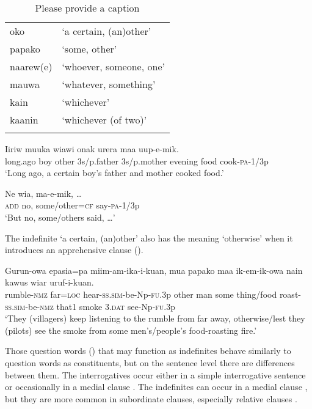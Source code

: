 \begin{table}
\caption{Please provide a caption}
\label{} 
\begin{tabular}{ll}
\mytoprule
oko &`a certain, (an)other'\\
papako &`some, other'\\
naarew(e) &`whoever, someone, one'\\
mauwa &`whatever, something'\\
kain &`whichever'\\
kaanin &`whichever (of two)'\\
\mybottomrule
\end{tabular}
\end{table}


\ea%
\label{ex:3:x641}
\gll Iiriw muuka  wiawi onak urera maa uup-e-mik.\\
long.ago boy other 3s/p.father 3s/p.mother evening food cook-\textsc{pa}-1/3p\\
\glt`Long ago, a certain boy's father and mother cooked food.'
\z

\ea%
\label{ex:3:x642}
\gll Ne wia,  ma-e-mik, {\dots} \\
\textsc{add} no, some/other=\textsc{cf} say-\textsc{pa}-1/3p\\
\glt`But no, some/others said, {\dots}'
\z

The indefinite  `a certain, (an)other' also has the meaning `otherwise' when it introduces an apprehensive clause ().

\ea%
\label{ex:3:x741}
\gll Gurun-owa epasia=pa miim-am-ika-i-kuan,  mua papako maa ik-em-ik-owa nain kawus wiar uruf-i-kuan.\\
rumble-\textsc{nmz} far=\textsc{loc} hear-\textsc{ss}.\textsc{sim}-be-Np-\textsc{fu}.3p other man some thing/food roast-\textsc{ss}.\textsc{sim}-be-\textsc{nmz} that1 smoke 3.\textsc{dat} see-Np-\textsc{fu}.3p\\
\glt`They (villagers) keep listening to the rumble from far away, otherwise/lest they (pilots) see the smoke from some men's/people's food-roasting fire.'
\z

Those question words () that may function as indefinites behave similarly to question words as  constituents, but on the sentence level there are differences between them. The interrogatives occur either in a simple interrogative sentence or occasionally in a medial clause . The indefinites can occur in a medial clause , but they are more common in subordinate clauses, especially relative clauses . 

